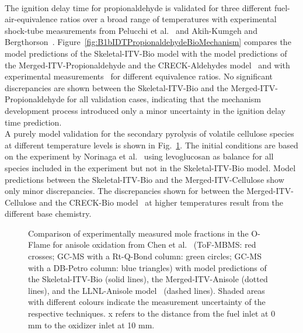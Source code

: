 \begin{refsection}
\begin{figure}[t]
  \label{fig:B1bCellulosePyrolysisBioMechanism}
\end{figure}
\\
The ignition delay time for propionaldehyde is validated for three different fuel-air-equivalence ratios over a broad range of temperatures with experimental shock-tube measurements from Pelucchi et al.~\cite{Pelucchi2015} and Akih-Kumgeh and Bergthorson~\cite{AkihKumgeh2011}. Figure~\ref{fig:B1bIDTPropionaldehydeBioMechanism} compares the model predictions of the Skeletal-ITV-Bio model with the model predictions of the Merged-ITV-Propionaldehyde and the CRECK-Aldehydes model~\cite{Pelucchi2015} and with experimental measurements~\cite{Pelucchi2015, AkihKumgeh2011} for different equivalence ratios. No significant discrepancies are shown between the Skeletal-ITV-Bio and the Merged-ITV-Propionaldehyde for all validation cases, indicating that the mechanism development process introduced only a minor uncertainty in the ignition delay time prediction.
\\
A purely model validation for the secondary pyrolysis of volatile cellulose species at different temperature levels is shown in Fig.~\ref{fig:B1bCellulosePyrolysisBioMechanism}. The initial conditions are based on the experiment by Norinaga et al.~\cite{Norinaga2013} using levoglucosan as balance for all species included in the experiment but not in the Skeletal-ITV-Bio model. Model predictions between the Skeletal-ITV-Bio and the Merged-ITV-Cellulose show only minor discrepancies. The discrepancies shown for  between the Merged-ITV-Cellulose and the CRECK-Bio model~\cite{Debiagi2016} at higher temperatures result from the different base chemistry.
\begin{figure}[b]
  \centering
  \hfill
  \hfill
  \caption{Comparison of experimentally measured mole fractions in the O-Flame for anisole oxidation from Chen et al.~\cite{Chen2022} (ToF-MBMS: red crosses; GC-MS with a Rt-Q-Bond column: green circles; GC-MS with a DB-Petro column: blue triangles) with model predictions of the Skeletal-ITV-Bio (solid lines), the Merged-ITV-Anisole (dotted lines), and the LLNL-Anisole model~\cite{Wagnon2018} (dashed lines). Shaded areas with different colours indicate the measurement uncertainty of the respective techniques. x refers to the distance from the fuel inlet at 0 mm to the oxidizer inlet at 10 mm.}

\end{figure}
\end{refsection}
